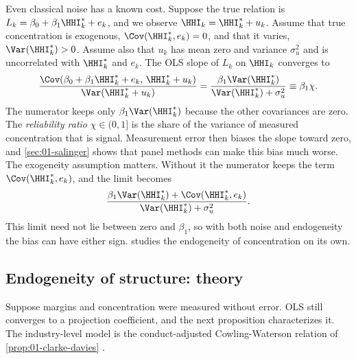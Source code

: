 Even classical noise has a known cost. Suppose the true relation is $L_k = \beta_0 + \beta_1 \HHI^*_k +
e_k$, and we observe $\HHI_k = \HHI^*_k + u_k$. Assume that true concentration is exogenous, $\Cov(\HHI^*_k,
e_k) = 0$, and that it varies, $\Var(\HHI^*_k) > 0$. Assume also that $u_k$ has mean zero and variance
$\sigma_u^2$ and is uncorrelated with $\HHI^*_k$ and $e_k$. The OLS slope of $L_k$ on $\HHI_k$ converges to
\begin{equation}\label{eq:01-attenuation}
\frac{\Cov(\beta_0 + \beta_1 \HHI^*_k + e_k, \, \HHI^*_k + u_k)}{\Var(\HHI^*_k + u_k)}
 = \frac{\beta_1 \Var(\HHI^*_k)}{\Var(\HHI^*_k) + \sigma_u^2}
 \equiv \beta_1 \chi .
\end{equation}
The numerator keeps only $\beta_1 \Var(\HHI^*_k)$ because the other covariances are zero. The
\emph{reliability ratio} $\chi \in (0, 1]$ is the share of the variance of measured concentration that
is signal. Measurement error then biases the slope toward zero, and \cref{sec:01-salinger} shows that panel
methods can make this bias much worse. The exogeneity assumption matters. Without it the numerator
keeps the term $\Cov(\HHI^*_k, e_k)$, and the limit becomes
\[
\frac{\beta_1 \Var(\HHI^*_k) + \Cov(\HHI^*_k, e_k)}{\Var(\HHI^*_k) + \sigma_u^2} .
\]
This limit need not lie between zero and $\beta_1$, so with both noise and endogeneity the bias can
have either sign.  studies the endogeneity of concentration on its own.

\subsection{Endogeneity of structure: theory}\label{sec:01-endogeneity}

Suppose margins and concentration were measured without error. OLS still converges to a projection
coefficient, and the next proposition characterizes it. The industry-level model is the
conduct-adjusted Cowling-Waterson relation of \cref{prop:01-clarke-davies}
\citep{CowlingWaterson1976,ClarkeDavies1982}.

